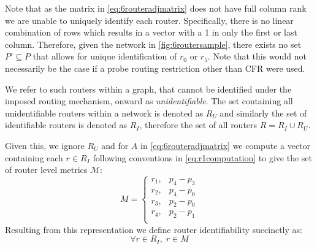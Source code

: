 Note that as the matrix in \cref{eq:6routeradjmatrix} does not have full column rank we are unable to uniquely identify each router. Specifically, there is no linear combination of rows which results in a vector with a 1 in only the first or last column. Therefore, given the network in \cref{fig:6routersample}, there exists no set $P' \subseteq P$ that allows for unique identification of $r_0$ or $r_5$. Note that this would not necessarily be the case if a probe routing restriction other than CFR were used.\par
We refer to such routers within a graph, that cannot be identified under the imposed routing mechanism, onward as \textit{unidentifiable}. The set containing all unidentifiable routers within a network is denoted as $R_U$ and similarly the set of identifiable routers is denoted as $R_I$, therefore the set of all routers $R = R_I\cup R_U$.\par
Given this, we ignore $R_U$ and for $A$ in \cref{eq:6routeradjmatrix} we compute a vector containing each $r \in R_I$ following conventions in \cref{eq:r1computation} to give the set of router level metrics $\mathcal{M}$:
\begin{equation*}
    M = 
    \begin{cases}
    r_1, & p_4-p_3\\
    r_2, & p_4-p_0\\
    r_3, & p_2-p_0\\
    r_4, & p_2-p_1\\
    \end{cases}
\end{equation*}
Resulting from this representation we define router identifiability succinctly as:
\begin{equation}
\label{eq:identifiability}
    \forall r \in R_I,\;r \in M 
\end{equation}

